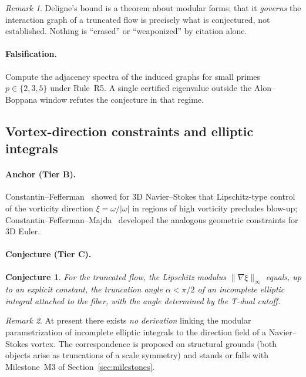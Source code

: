 \documentclass[11pt,a4paper]{article}
\theoremstyle{plain}
\newtheorem{conjecture}{Conjecture}
\theoremstyle{definition}
\theoremstyle{remark}
\newtheorem{remark}{Remark}
\newcommand{\tierB}{\textbf{Tier B}}
\newcommand{\tierC}{\textbf{Tier C}}
\begin{document}
\begin{remark}
Deligne's bound is a theorem about modular forms; that it \emph{governs} the
interaction graph of a truncated flow is precisely what is conjectured, not
established. Nothing is ``erased'' or ``weaponized'' by citation alone.
\end{remark}

\paragraph{Falsification.} Compute the adjacency spectra of the induced
graphs for small primes $p\in\{2,3,5\}$ under Rule~R5. A single certified
eigenvalue outside the Alon--Boppana window refutes the conjecture in that
regime.

\subsection{Vortex-direction constraints and elliptic integrals}
\label{sec:cfm}

\paragraph{Anchor (\tierB{}).} Constantin--Fefferman~\cite{CF1993} showed
for 3D Navier--Stokes that Lipschitz-type control of the vorticity direction
$\xi=\omega/|\omega|$ in regions of high vorticity precludes blow-up;
Constantin--Fefferman--Majda~\cite{CFM1996} developed the analogous
geometric constraints for 3D Euler.

\paragraph{Conjecture (\tierC{}).}
\begin{conjecture}\label{conj:cfm}
For the truncated flow, the Lipschitz modulus $\|\nabla\xi\|_{\infty}$
equals, up to an explicit constant, the truncation angle
$\alpha<\pi/2$ of an incomplete elliptic integral attached to the fiber,
with the angle determined by the T-dual cutoff.
\end{conjecture}

\begin{remark}
At present there exists \emph{no derivation} linking the modular
parametrization of incomplete elliptic integrals to the direction field of a
Navier--Stokes vortex. The correspondence is proposed on structural grounds
(both objects arise as truncations of a scale symmetry) and stands or falls
with Milestone~M3 of Section~\ref{sec:milestones}.
\end{remark}
\end{document}
